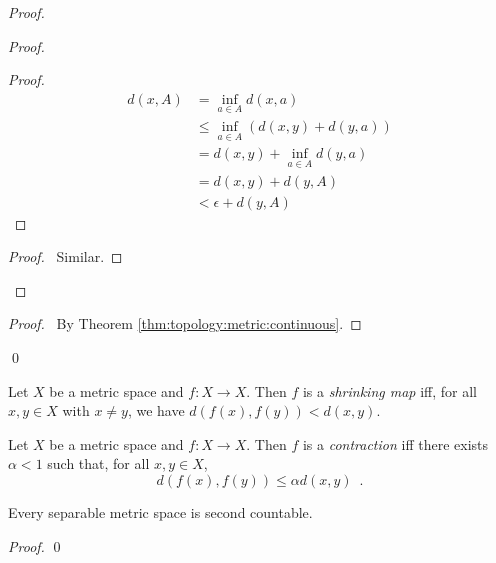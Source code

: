 \begin{proof}
  \pf
  \begin{proof}
    \pf
    \begin{proof}
      \pf
      \begin{align*}
        d(x, A) & = \inf_{a \in A} d(x, a) \\
        & \leq \inf_{a \in A} (d(x, y) + d(y, a)) \\
        & = d(x, y) + \inf_{a \in A} d(y, a) \\
        & = d(x, y) + d(y, A) \\
        & < \epsilon + d(y, A)
      \end{align*}
    \end{proof}
    \begin{proof}
      \pf\ Similar.
    \end{proof}
  \end{proof}
  \qedstep
  \begin{proof}
    \pf\ By Theorem \ref{thm:topology:metric:continuous}.
  \end{proof}
  \qed
\end{proof}

\begin{df}
  Let $X$ be a metric space and $f : X \rightarrow X$. Then $f$ is a
  \emph{shrinking map} iff, for all $x, y \in X$ with $x \neq y$, we have
  $d(f(x), f(y)) < d(x, y)$.
\end{df}

\begin{df}[Contraction]
  Let $X$ be a metric space and $f : X \rightarrow X$. Then $f$ is a
  \emph{contraction} iff there exists $\alpha < 1$ such that, for all $x, y
  \in X$,
  \[ d(f(x), f(y)) \leq \alpha d(x, y) \enspace . \]
\end{df}

  \begin{prop}
 Every separable metric space is second countable.
\end{prop}

\begin{proof}
 \pf
 \qed
\end{proof}

